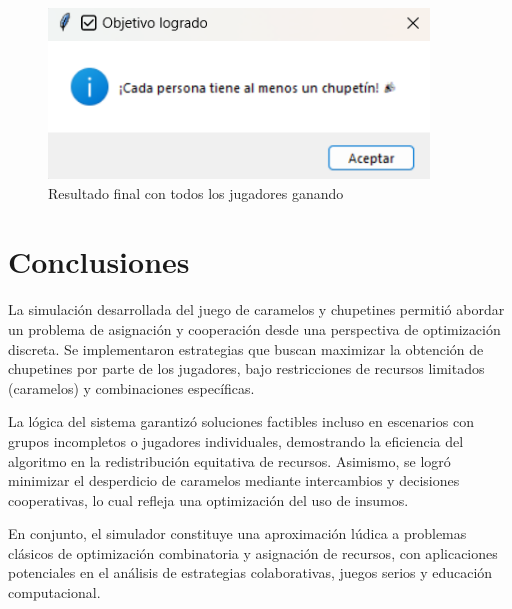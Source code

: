 \documentclass[12pt,spanish]{article}
\begin{document}
\begin{figure}[h!]
  \centering
  \includegraphics[width=0.9\textwidth]{cara4.png}
  \caption{Resultado final con todos los jugadores ganando}
\end{figure}

\clearpage

\section{Conclusiones}

La simulación desarrollada del juego de caramelos y chupetines permitió abordar un problema de asignación y cooperación desde una perspectiva de optimización discreta. Se implementaron estrategias que buscan maximizar la obtención de chupetines por parte de los jugadores, bajo restricciones de recursos limitados (caramelos) y combinaciones específicas.

La lógica del sistema garantizó soluciones factibles incluso en escenarios con grupos incompletos o jugadores individuales, demostrando la eficiencia del algoritmo en la redistribución equitativa de recursos. Asimismo, se logró minimizar el desperdicio de caramelos mediante intercambios y decisiones cooperativas, lo cual refleja una optimización del uso de insumos.

En conjunto, el simulador constituye una aproximación lúdica a problemas clásicos de optimización combinatoria y asignación de recursos, con aplicaciones potenciales en el análisis de estrategias colaborativas, juegos serios y educación computacional.


\end{document}
